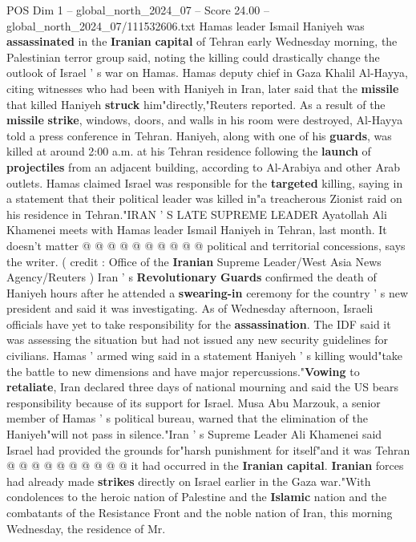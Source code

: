 \begin{textsample}{POS Dim 1 – global\_north\_2024\_07 – Score 24.00 – global\_north\_2024\_07/111532606.txt}  \label{ex:f1_pos_185}
Hamas leader Ismail Haniyeh was \textbf{assassinated} in the \textbf{Iranian} \textbf{capital} of Tehran early Wednesday morning, the Palestinian terror group said, noting the killing could drastically change the outlook of Israel ' s war on Hamas.
Hamas deputy chief in Gaza Khalil Al-Hayya, citing witnesses who had been with Haniyeh in Iran, later said that the \textbf{missile} that killed Haniyeh \textbf{struck} him"directly,"Reuters reported.
As a result of the \textbf{missile} \textbf{strike}, windows, doors, and walls in his room were destroyed, Al-Hayya told a press conference in Tehran.
Haniyeh, along with one of his \textbf{guards}, was killed at around 2:00 a.m. at his Tehran residence following the \textbf{launch} of \textbf{projectiles} from an adjacent building, according to Al-Arabiya and other Arab outlets.
Hamas claimed Israel was responsible for the \textbf{targeted} killing, saying in a statement that their political leader was killed in"a treacherous Zionist raid on his residence in Tehran."IRAN ' S LATE SUPREME LEADER Ayatollah Ali Khamenei meets with Hamas leader Ismail Haniyeh in Tehran, last month.
It doesn't matter @ @ @ @ @ @ @ @ @ @ political and territorial concessions, says the writer. ( credit : Office of the \textbf{Iranian} Supreme Leader/West Asia News Agency/Reuters ) Iran ' s \textbf{Revolutionary} \textbf{Guards} confirmed the death of Haniyeh hours after he attended a \textbf{swearing-in} ceremony for the country ' s new president and said it was investigating.
As of Wednesday afternoon, Israeli officials have yet to take responsibility for the \textbf{assassination}.
The IDF said it was assessing the situation but had not issued any new security guidelines for civilians.
Hamas ' armed wing said in a statement Haniyeh ' s killing would"take the battle to new dimensions and have major repercussions."\textbf{Vowing} to \textbf{retaliate}, Iran declared three days of national mourning and said the US bears responsibility because of its support for Israel.
Musa Abu Marzouk, a senior member of Hamas ' s political bureau, warned that the elimination of the Haniyeh"will not pass in silence."Iran ' s Supreme Leader Ali Khamenei said Israel had provided the grounds for"harsh punishment for itself"and it was Tehran @ @ @ @ @ @ @ @ @ @ it had occurred in the \textbf{Iranian} \textbf{capital}. \textbf{Iranian} forces had already made \textbf{strikes} directly on Israel earlier in the Gaza war."With condolences to the heroic nation of Palestine and the \textbf{Islamic} nation and the combatants of the Resistance Front and the noble nation of Iran, this morning Wednesday, the residence of Mr.

\end{textsample}

